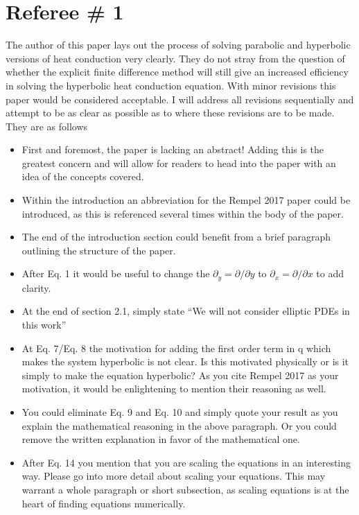 \documentclass[10pt,letterpaper]{article}
\author{Roy Smart}
\begin{document}
	
	\section{Referee \# 1}
	
		The author of this paper lays out the process of solving parabolic and hyperbolic versions of heat conduction very clearly. They do not stray from the question of whether the explicit finite difference method will still give an increased efficiency in solving the hyperbolic heat conduction equation. With minor revisions this paper would be considered acceptable. I will address all revisions sequentially and attempt to be as clear as possible as to where these revisions are to be made. They are as follows
	
		\begin{itemize}
			\item First and foremost, the paper is lacking an abstract! Adding this is the greatest concern and will allow for readers to head into the paper with an idea of the concepts covered.
			\item Within the introduction an abbreviation for the Rempel 2017 paper could be introduced, as this is referenced several times within the body of the paper.
			\item The end of the introduction section could benefit from a brief paragraph outlining the structure of the paper.
			\item After Eq. 1 it would be useful to change the $\partial_y =\partial/\partial y$  to $\partial_x = \partial / \partial x$ to add clarity.
			\item At the end of section 2.1, simply state ``We will not consider elliptic PDEs in this work''
			\item At Eq. 7/Eq. 8 the motivation for adding the first order term in q which makes the system hyperbolic is not clear. Is this motivated physically or is it simply to make the equation hyperbolic? As you cite Rempel 2017 as your motivation, it would be enlightening to mention their reasoning as well.
			\item You could eliminate Eq. 9 and Eq. 10 and simply quote your result as you explain the mathematical reasoning in the above paragraph. Or you could remove the written explanation in favor of the mathematical one.
			\item After Eq. 14 you mention that you are scaling the equations in an interesting way. Please go into more detail about scaling your equations. This may warrant a whole paragraph or short subsection, as scaling equations is at the heart of finding equations numerically.

\end{itemize}
\end{document}
